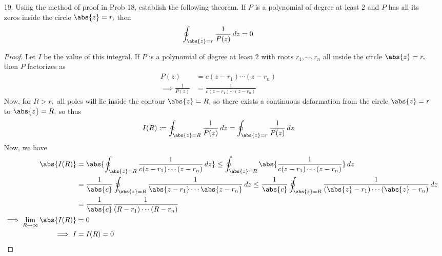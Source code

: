 \documentclass{article}
\begin{document}
\begin{itemize}
	\item[19.] Using the method of proof in Prob 18, establish the following theorem. If $P$ is a polynomial of degree at least 2 and $P$ has all its zeros inside the circle $\abs{z}=r,$ then
		\begin{align*}
			\oint_{\abs{z}=r} \frac{1}{P(z)}\, dz = 0
		\end{align*}
		\begin{proof}
			Let $I$ be the value of this integral. If $P$ is a polynomial of degree at least 2 with roots $r_1, \cdots, r_n$ all inside the circle $\abs{z}=r,$ then $P$ factorizes as
			\begin{align*}
				P(z) &= c(z-r_1)\cdots(z-r_n) \\
				\implies \frac{1}{P(z)} &= \frac{1}{c(z-r_1)\cdots(z-r_n)}
			\end{align*}
			Now, for $R>r,$ all poles will lie inside the contour $\abs{z}=R,$ so there exists a continuous deformation from the circle $\abs{z}=r$ to $\abs{z}=R,$ so thus
			\begin{align*}
				I(R) :=\oint_{\abs{z}=R} \frac{1}{P(z)} \, dz = \oint_{\abs{z}=r} \frac{1}{P(z)}\, dz
			\end{align*}
			Now, we have
			\begin{align*}
				\abs{I(R)} &= \abs{\oint_{\abs{z}=R} \frac{1}{c(z-r_1)\cdots(z-r_n)}\, dz} \le \oint_{\abs{z}=R} \abs{\frac{1}{c(z-r_1)\cdots(z-r_n)}}\, dz \\
				&= \frac{1}{\abs{c}} \oint_{\abs{z}=R} \frac{1}{\abs{z-r_1}\cdots\abs{z-r_n}}\, dz \le \frac{1}{\abs{c}} \oint_{\abs{z}=R} \frac{1}{\left( \abs{z}-r_1 \right)\cdots\left( \abs{z}-r_n \right)}\, dz \\
				&= \frac{1}{\abs{c}} \frac{1}{(R-r_1)\cdots(R-r_n)} \\
				\implies \lim_{R\to\infty} \abs{I(R)} &= 0 \\
				\implies I &= I(R) = 0
			\end{align*}
		\end{proof}


\end{itemize}
\end{document}
